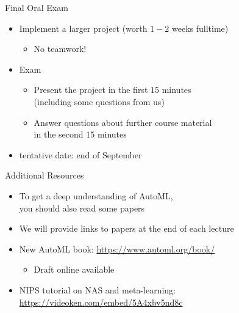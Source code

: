 \begin{frame}[c]{Final Oral Exam}

\begin{itemize}
  \item Implement a larger project (worth $1-2$ weeks fulltime)
	\begin{itemize}
		\item No teamwork!
	\end{itemize}
  \item Exam
	\begin{itemize}
		\item Present the project in the first $15$ minutes\\ (including some questions from us)
		\item Answer questions about further course material\\ in the second $15$ minutes
	\end{itemize}	
  \item tentative date: end of September
\end{itemize}

\end{frame}
\begin{frame}[c]{Additional Resources}

\begin{itemize}
  \item To get a deep understanding of AutoML,\\ you should also read some papers 
  \item We will provide links to papers at the end of each lecture
  \item New AutoML book: \url{https://www.automl.org/book/}
  \begin{itemize}
    \item Draft online available
  \end{itemize}
  \item NIPS tutorial on NAS and meta-learning: \url{https://videoken.com/embed/5A4xbv5nd8c}
\end{itemize}

\end{frame}

